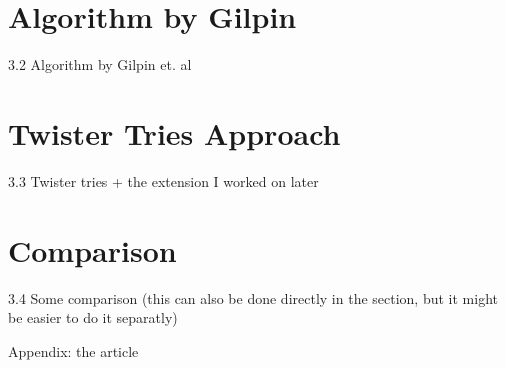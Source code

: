 \documentclass[utf8,english]{gradu3}
\begin{document}
\section{Algorithm by Gilpin}
3.2 Algorithm by Gilpin et. al

\section{Twister Tries Approach}
3.3 Twister tries + the extension I worked on later

\section{Comparison}
3.4 Some comparison (this can also be done directly in the section, but it might be easier to do it separatly)

Appendix: the article
\end{document}
